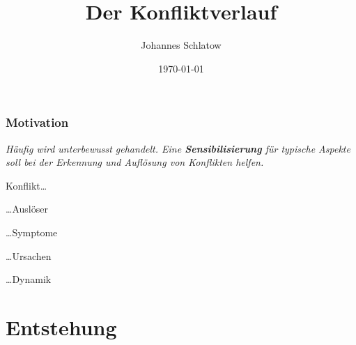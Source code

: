 \documentclass[
	ngerman,
	xcolor=dvipsnames,
	11pt
	]{beamer}
\title[ShortTitle]{Der Konfliktverlauf}
\author{Johannes Schlatow}
\institute{}
\date{\today}
\newenvironment{annot}{\begin{block}{}\it}{\end{block}}
\begin{document}
\begin{frame}[t,plain]
	\titlepage
\end{frame}

\begin{frame}
	\frametitle{Motivation}
\begin{annot}
	Häufig wird unterbewusst gehandelt. Eine \textbf{Sensibilisierung} für typische Aspekte soll bei der Erkennung und Auflösung von Konflikten helfen.	
\end{annot}

Konflikt\ldots
\begin{description}
	\item \ldots Auslöser
	\item \ldots Symptome
	\item \ldots Ursachen
	\item \ldots Dynamik
\end{description}
\end{frame}

\section{Entstehung}
\end{document}
